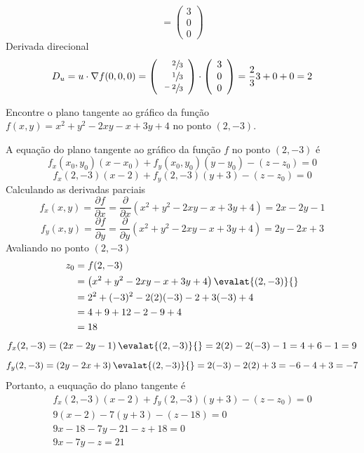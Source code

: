 \documentclass[a4paper,12pt,fleqn]{article}
\newcommand{\D}[2]{\frac{\partial {#1}}{\partial {#2}}}
\begin{document}
\begin{answer}
\[    = \left(\begin{array}{r}
    3 \\
    0 \\
    0
    \end{array}\right)
  \]
  Derivada direcional
  \[
    D_u
    = u \cdot \nabla f(0, 0, 0)
    = \left(\begin{array}{r} \sfrac{2}{3} \\ \sfrac{1}{3} \\ \sfrac{-2}{3} \end{array}\right)
      \cdot
      \left(\begin{array}{r} 3 \\ 0 \\ 0 \end{array}\right)
    = \frac{2}{3}3 + 0 + 0
    = 2
  \]
  \clearpage
\end{answer}

Encontre o plano tangente ao gráfico da função
\(
  f(x, y) = x^2 + y^2 -2xy -x +3y + 4
\)
no ponto \((2, -3)\).

\begin{answer}
  A equação do plano tangente ao gráfico da função $f$ no ponto \((2, -3)\) é
  \[
    f_x(x_0, y_0)(x-x_0) + f_y(x_0, y_0)(y-y_0) - (z-z_0) = 0
  \]
  \[
    f_x(2, -3)(x-2) + f_y(2, -3)(y+3) - (z-z_0) = 0
  \]
  Calculando as derivadas parciais
  \[
    f_x(x, y)
    = \D{f}{x}
    = \D{}{x}\left(x^2 + y^2 -2xy -x +3y + 4\right)
    = 2x -2y -1
  \]
  \[
    f_y(x, y)
    = \D{f}{y}
    = \D{}{y}\left(x^2 + y^2 -2xy -x +3y + 4\right)
    = 2y - 2x + 3
  \]
  Avaliando no ponto \((2, -3)\)
  \begin{align*}
    z_0
    & = f(2, -3) \\
    & = \left(x^2 + y^2 -2xy -x +3y + 4\right)\evalat{(2, -3)}{} \\
    & = 2^2 + (-3)^2 -2(2)(-3) -2 +3(-3) + 4 \\
    & = 4 + 9 + 12 - 2 - 9 + 4 \\
    & = 18
  \end{align*}
  \[
    f_x(2, -3)
    = \left(2x -2y -1\right)\evalat{(2, -3)}{}
    = 2(2) - 2(-3) - 1
    = 4 + 6 - 1
    = 9
  \]
  \[
    f_y(2, -3)
    = \left(2y - 2x + 3\right)\evalat{(2, -3)}{}
    = 2(-3) - 2(2) + 3
    = -6 -4 + 3
    = -7
  \]
  Portanto, a euquação do plano tangente é
  \begin{gather*}
      f_x(2, -3)(x-2) + f_y(2, -3)(y+3) - (z-z_0) = 0 \\
      9(x-2) -7(y+3) - (z-18) = 0 \\
      9x - 18 -7y -21 -z +18 = 0 \\
      9x -7y -z = 21
  \end{gather*}
  \clearpage
\end{answer}
\end{document}
